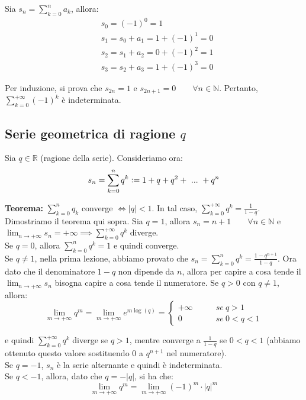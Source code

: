 \documentclass{article}
\begin{document}
\noindent Sia $s_n = \sum_{k = 0}^n a_k$, allora:
\begin{align*}
    & s_0 = (-1)^0 = 1 \\
    & s_1 = s_0 + a_1 = 1 + (-1)^1 = 0 \\
    & s_2 = s_1 + a_2 = 0 + (-1)^2 = 1 \\
    & s_3 = s_2 + a_3 = 1 + (-1)^3 = 0
\end{align*}

\noindent Per induzione, si prova che $s_{2n} = 1$ e $s_{2n + 1} = 0 \qquad \forall n \in \mathbb{N}$. Pertanto, $\sum_{k = 0}^{+\infty} (-1)^k$ è indeterminata. 

\subsection{Serie geometrica di ragione $q$}
Sia $q \in \mathbb{R}$ (ragione della serie). Consideriamo ora:
\begin{equation*}
    s_n = \sum_{k = 0}^n q^k \vcentcolon = 1 + q + q^2 + \ ... \ + q^n
\end{equation*}

\noindent\textbf{Teorema:} $\sum_{k = 0}^{n} q_k$ converge $\iff |q| < 1$. In tal caso, $\sum_{k = 0}^{+\infty} q^k = \frac{1}{1 - q}$.\\

\noindent Dimostriamo il teorema qui sopra. Sia $q = 1$, allora $s_n = n + 1 \qquad \forall n \in \mathbb{N}$ e $\lim_{n \to +\infty} s_n = +\infty \implies \sum_{k = 0}^{+\infty} q^k$ diverge. \\
Se $q = 0$, allora $\sum_{k = 0}^n q^k = 1$ e quindi converge. \\
Se $q \neq 1$, nella prima lezione, abbiamo provato che $s_n = \sum_{k = 0}^n q^k = \frac{1 - q^{n + 1}}{1 - q}$. Ora dato che il denominatore $1 - q$ non dipende da $n$, allora per capire a cosa tende il $\lim_{n \to +\infty} s_n$ bisogna capire a cosa tende il numeratore. Se $q > 0$ con $q \neq 1$, allora:
\begin{equation*}
    \lim_{m \to +\infty} q^m = \lim_{m \to +\infty} e^{m\log(q)} = \begin{cases}
        +\infty \qquad & se \ q > 1 \\
        0 \qquad & se \ 0 < q < 1
    \end{cases}
\end{equation*}

\noindent e quindi $\sum_{k = 0}^{+\infty} q^k$ diverge se $q > 1$, mentre converge a $\frac{1}{1 - q}$ se $0 < q < 1$ (abbiamo ottenuto questo valore sostituendo $0$ a $q^{n + 1}$ nel numeratore).\\
Se $q = -1$, $s_n$ è la serie alternante e quindi è indeterminata.\\
Se $q < -1$, allora, dato che $q = -|q|$, si ha che:
\begin{equation*}
    \lim_{m \to +\infty} q^m = \lim_{m \to +\infty} (-1)^m \cdot |q|^m
\end{equation*}
\end{document}
